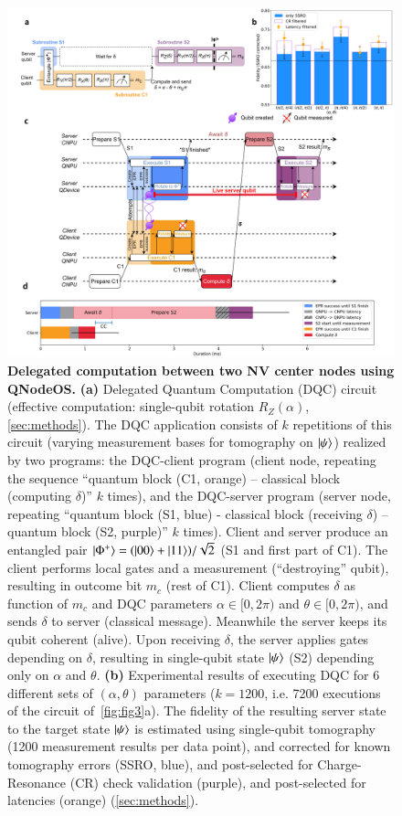 \begin{figure}[htbp]
\centering
\includegraphics[width=0.89\linewidth]{figures/qnodeos/main/fig3/fig3.png}
\caption{\textbf{Delegated computation between two NV center nodes using QNodeOS.} 
\textbf{(a)} Delegated Quantum Computation (DQC) circuit (effective computation: single-qubit rotation $R_Z (\alpha)$, \cref{sec:methods}). The DQC application consists of $k$ repetitions of this circuit (varying measurement bases for tomography on $\ket{\psi}$) realized by two programs: the DQC-client program (client node, repeating the sequence ``quantum block (C1, orange) – classical block (computing $\delta$)'' $k$ times), and the DQC-server program (server node, repeating ``quantum block (S1, blue) - classical block (receiving $\delta$) – quantum block (S2, purple)'' $k$ times). Client and server produce an entangled pair $\ket{\Phi^+} = (\ket{00} + \ket{11}) / \sqrt{2}$ (S1 and first part of C1). The client performs local gates and a measurement (``destroying'' qubit), resulting in outcome bit $m_c$ (rest of C1). Client computes $\delta$ as function of $m_c$ and DQC parameters $\alpha \in [0,2\pi)$ and $\theta \in [0, 2\pi)$, and sends $\delta$ to server (classical message). Meanwhile the server keeps its qubit coherent (alive). Upon receiving $\delta$, the server applies gates depending on $\delta$, resulting in single-qubit state $\ket{\psi}$ (S2) depending only on $\alpha$ and $\theta$.
\textbf{(b)} Experimental results of executing DQC for 6 different sets of $(\alpha, \theta)$ parameters ($k=1200$, i.e. 7200 executions of the circuit of~\ref{fig:fig3}a). The fidelity of the resulting server state to the target state $\ket{\psi}$ is estimated using single-qubit tomography (1200 measurement results per data point), and corrected for known tomography errors (SSRO, blue), and post-selected for Charge-Resonance (CR) check validation (purple), and post-selected for latencies (orange) (\cref{sec:methods}).
}
\end{figure}
